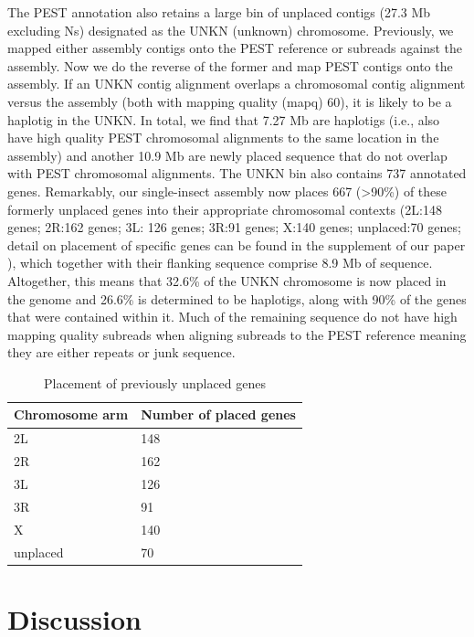 {\par{
The PEST annotation also retains a large bin of unplaced contigs (27.3 Mb excluding Ns) designated as the UNKN (unknown) chromosome. Previously, we mapped either assembly contigs onto the PEST reference or subreads against the assembly. Now we do the reverse of the former and map PEST contigs onto the assembly. If an UNKN contig alignment overlaps a chromosomal contig alignment versus the assembly (both with mapping quality (mapq) 60), it is likely to be a haplotig in the UNKN. In total, we find that 7.27 Mb are haplotigs (i.e., also have high quality PEST chromosomal alignments to the same location in the assembly) and another 10.9 Mb are newly placed sequence that do not overlap with PEST chromosomal alignments. The UNKN bin also contains 737 annotated genes. Remarkably, our single-insect assembly now places 667 (>90\%) of these formerly unplaced genes into their appropriate chromosomal contexts (2L:148 genes; 2R:162 genes; 3L: 126 genes; 3R:91 genes; X:140 genes; unplaced:70 genes; detail on placement of specific genes can be found in the supplement of our paper \cite{singlemosquito}), which together with their flanking sequence comprise 8.9 Mb of sequence. Altogether, this means that 32.6\% of the UNKN chromosome is now placed in the genome and 26.6\% is determined to be haplotigs, along with 90\% of the genes that were contained within it. Much of the remaining sequence do not have high mapping quality subreads when aligning subreads to the PEST reference meaning they are either repeats or junk sequence.
}

\begin{table}[htbp!]
\caption{Placement of previously unplaced genes}
\label{table:unplaced}
\begin{tabular}{ | l | l |}
\hline
 Chromosome arm & Number of placed genes  \\
 
 \hline
 2L & 148 \\
 \hline
 2R & 162 \\
 \hline
 3L & 126 \\
 \hline
 3R & 91 \\
 \hline
 X & 140 \\
 \hline
 unplaced & 70 \\
 \hline
\end{tabular} 
\end{table}

\section{Discussion}

}
